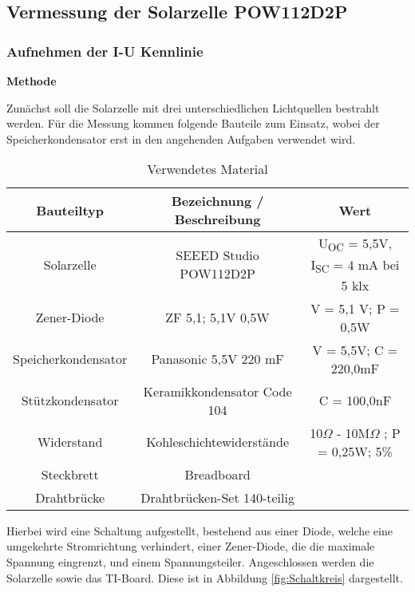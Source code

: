 \subsection {Vermessung der Solarzelle POW112D2P}                   %
    \subsubsection{Aufnehmen der I-U Kennlinie}                         %
        \textbf{Methode}
        \newline
        
        \par Zunächst soll die Solarzelle mit drei unterschiedlichen Lichtquellen bestrahlt werden. 
        Für die Messung kommen folgende Bauteile zum Einsatz, wobei der Speicherkondensator erst in den angehenden Aufgaben verwendet wird.
        \begin{table}[H]
        	\centering
        	\caption{Verwendetes Material}
        	\label{tab:Bauteile}
        	\begin{tabular}{ccc}
        		\toprule
        		Bauteiltyp & Bezeichnung / Beschreibung & Wert\\
        		\midrule
        		Solarzelle & SEEED Studio POW112D2P  & U\textsubscript{OC} = 5,5V, I\textsubscript{SC} = 4 mA bei 5 klx \\
        		Zener-Diode & ZF 5,1; 5,1V 0,5W  & V = 5,1 V; P = 0,5W \\
        		Speicherkondensator & Panasonic 5,5V 220 mF & V = 5,5V; C = 220,0mF \\
        		Stützkondensator & Keramikkondensator Code 104 & C = 100,0nF \\
        		Widerstand & Kohleschichtewiderstände  & 10$\Omega$ - 10M$\Omega$ ; P = 0,25W; 5\% \\
        		Steckbrett & Breadboard
        		& \ \\
        		Drahtbrücke & Drahtbrücken-Set 140-teilig
        		& \ \\
        		\bottomrule
        	\end{tabular}
        \end{table}
        Hierbei wird eine Schaltung aufgestellt, bestehend aus einer Diode, welche eine umgekehrte Stromrichtung verhindert, einer Zener-Diode, die die maximale Spannung eingrenzt, und einem Spannungsteiler. Angeschlossen werden die Solarzelle sowie das TI-Board. Diese ist in Abbildung \ref{fig:Schaltkreis} dargestellt.
